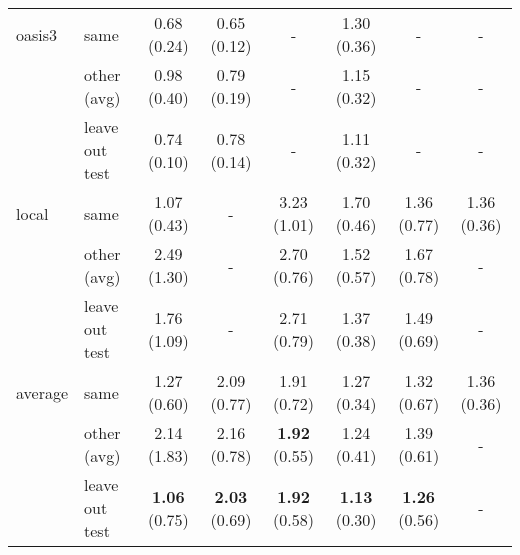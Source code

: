 \begin{table*}
\begin{tabular}{llcccccc}
\midrule
oasis3 & same           &  0.68 (0.24) &  0.65 (0.12) &            - &  1.30 (0.36) &            - &            - \\
       & other (avg)    &  0.98 (0.40) &  0.79 (0.19) &            - &  1.15 (0.32) &            - &            - \\
       & leave out test &  0.74 (0.10) &  0.78 (0.14) &            - &  1.11 (0.32) &            - &            - \\
\midrule
local  & same           &  1.07 (0.43) &            - &  3.23 (1.01) &  1.70 (0.46) &  1.36 (0.77) &  1.36 (0.36) \\
       & other (avg)    &  2.49 (1.30) &            - &  2.70 (0.76) &  1.52 (0.57) &  1.67 (0.78) &            - \\
       & leave out test &  1.76 (1.09) &            - &  2.71 (0.79) &  1.37 (0.38) &  1.49 (0.69) &            - \\
\midrule
\midrule
average& same           &  1.27 (0.60) &  2.09 (0.77) &  1.91 (0.72) &  1.27 (0.34) &  1.32 (0.67) &  1.36 (0.36) \\
       & other (avg)    &  2.14 (1.83) &  2.16 (0.78) &  \textbf{1.92} (0.55) &  1.24 (0.41) &  1.39 (0.61) &            - \\
       & leave out test &  \textbf{1.06} (0.75) &  \textbf{2.03} (0.69) &  \textbf{1.92} (0.58) &  \textbf{1.13} (0.30) &  \textbf{1.26} (0.56) &            - \\
\bottomrule
\end{tabular}
\end{table*}
